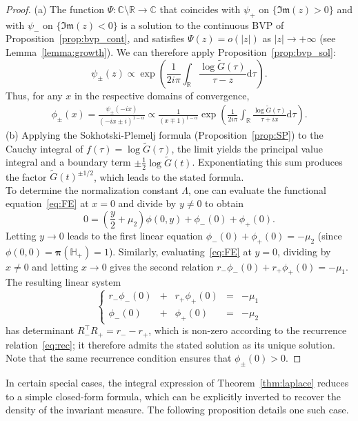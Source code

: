 \documentclass{article}
\theoremstyle{plain}
\theoremstyle{definition}
\theoremstyle{remark}
\begin{document}
\begin{proof} (a) The function $\Psi:\mathbb C\setminus \mathbb R\to\mathbb C$ that coincides with $\psi_+$ on $\{\mathfrak{Im}(z)>0\}$ and with $\psi_-$ on $\{\mathfrak{Im}(z)<0\}$ is a solution to the continuous BVP of Proposition~\ref{prop:bvp_cont}, and satisfies $\Psi(z)=o(|z|)$ as $|z|\to+\infty$ (see Lemma~\ref{lemma:growth}). We can therefore apply Proposition~\ref{prop:bvp_sol}:
    $$\psi_\pm(z)\propto \exp\left(\frac{1}{2i\pi}\int_\mathbb R \frac{\log \widetilde{G}(\tau)}{\tau-z}\mathrm{d}\tau\right).$$
    Thus, for any $x$ in the respective domains of convergence,
    \begin{align*}
        \phi_\pm(x) = \frac{\psi_\pm(-ix)}{(-ix \pm i)^{1-\alpha}}\propto \frac{1}{(x\mp 1)^{1-\alpha}}\exp\left(\frac{1}{2i\pi}\int_{\mathbb R}\frac{\log\widetilde{G}(\tau)}{\tau+ix}\mathrm{d}\tau\right).
    \end{align*}
    (b) Applying the Sokhotski-Plemelj formula (Proposition~\ref{prop:SP}) to the Cauchy integral of $f(\tau)=\log\widetilde{G}(\tau)$, the limit yields the principal value integral and a boundary term $\pm\frac{1}{2}\log\widetilde{G}(t)$. Exponentiating this sum produces the factor $\widetilde{G}(t)^{\pm 1/2}$, which leads to the stated formula.\\
    To determine the normalization constant $\Lambda$, one can evaluate the functional equation~\eqref{eq:FE} at $x=0$ and divide by $y\ne 0$ to obtain
    $$0=\left(\frac{y}{2}+\mu_2\right)\phi(0,y)+\phi_-(0)+\phi_+(0).$$
    Letting $y\to 0$ leads to the first linear equation $\phi_-(0)+\phi_+(0)=-\mu_2$ (since $\phi(0,0)=\boldsymbol{\pi}(\mathbb H_+)=1$). Similarly, evaluating~\eqref{eq:FE} at $y=0$, dividing by $x\ne 0$ and letting $x\to 0$ gives the second relation $r_-\phi_-(0)+r_+\phi_+(0)=-\mu_1$. The resulting linear system 
    $$\left\{\begin{array}{ccccc}
         r_-\phi_-(0)&+&r_+\phi_+(0)&=&-\mu_1  \\
         \phi_-(0)&+&\phi_+(0)&=&-\mu_2
    \end{array}\right.$$
    has determinant $R_-^\intercal R_+=r_--r_+$, which is non-zero according to the recurrence relation~\eqref{eq:rec}; it therefore admits the stated solution as its unique solution. Note that the same recurrence condition ensures that $\phi_\pm(0)>0$.
\end{proof}

In certain special cases, the integral expression of Theorem~\ref{thm:laplace} reduces to a simple closed-form formula, which can be explicitly inverted to recover the density of the invariant measure. The following proposition details one such case.
\end{document}
